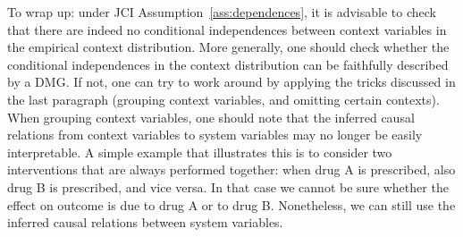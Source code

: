 \documentclass[twoside,11pt]{article}
\newcommand{\Prb}{\mathbb{P}}
\newcommand{\Joris}[1]{{\color{blue}#1}}
\newcommand{\Sara}[1]{{\color{purple}#1}}
\newcommand{\Tom}[1] {{\color{green}#1}}
\begin{document}
To wrap up: under JCI Assumption~\ref{ass:dependences}, it is advisable to check
that there are indeed no conditional independences between context variables in the
empirical context distribution. More generally, one should check whether the
conditional independences in the context distribution can be faithfully described
by a DMG. If not, one can try to work around by applying the tricks discussed in 
the last paragraph (grouping context variables, and omitting certain contexts). 
When grouping context variables, one should note that the inferred causal relations from
context variables to system variables may no longer be easily interpretable. A
simple example that illustrates this is to consider two interventions that are
always performed together: when drug A is prescribed, also drug B is
prescribed, and vice versa. In that case we cannot be sure whether the effect
on outcome is due to drug A or to drug B. Nonetheless, we can still use the
inferred causal relations between system variables.


\end{document}

